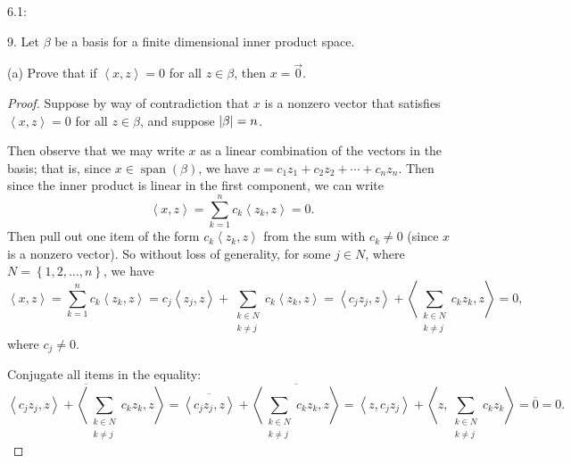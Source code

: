 \documentclass[11pt]{article}
\newcommand{\cbr}[1]{\left\{#1\right\}}
\newcommand{\abr}[1]{\left\langle#1\right\rangle}
\DeclareMathOperator{\Span}{span}
\begin{document}
6.1:

9. Let $\beta$ be a basis for a finite dimensional inner product space.

(a) Prove that if $\abr{x,z} = 0$ for all $z\in\beta$, then $x=\vec{0}$.

\begin{proof}
  Suppose by way of contradiction that $x$ is a nonzero vector that satisfies $\abr{x,z} = 0$ for all $z\in\beta$, and suppose $\abs{\beta} = n$. 
  
  Then observe that we may write $x$ as a linear combination of the vectors in the basis; that is, since $x\in\Span(\beta)$, we have $x = c_1z_1 + c_2z_2 + \cdots + c_nz_n$. Then since the inner product is linear in the first component, we can write $$\abr{x,z} = \sum_{k=1}^nc_k\abr{z_k,z} = 0.$$ Then pull out one item of the form $c_k\abr{z_k,z}$ from the sum with $c_k\neq 0$ (since $x$ is a nonzero vector). So without loss of generality, for some $j\in N$, where $N = \cbr{1,2,\dots,n}$, we have $$\abr{x,z} = \sum_{k=1}^nc_k\abr{z_k,z} = c_j\abr{z_j,z} + \sum\limits_{\substack{k\in N \\ k\neq j}}c_k\abr{z_k,z} = \abr{c_jz_j,z} + \abr{\sum\limits_{\substack{k\in N \\ k\neq j}}c_kz_k,z} = 0,$$ where $c_j\neq 0$.

  
  Conjugate all items in the equality: $$\overline{\abr{c_jz_j,z} + \abr{\sum\limits_{\substack{k\in N \\ k\neq j}}c_kz_k,z}} = \overline{\abr{c_jz_j,z}} + \overline{\abr{\sum\limits_{\substack{k\in N \\ k\neq j}}c_kz_k,z}} = \abr{z,c_jz_j} + \abr{z,\sum\limits_{\substack{k\in N \\ k\neq j}}c_kz_k} = \overline{0} = 0.$$


\end{proof}
\end{document}
